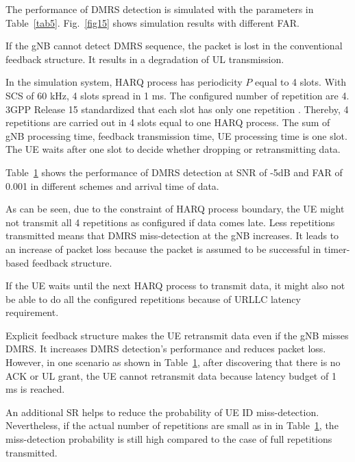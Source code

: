 \documentclass{ieeeaccess}
\begin{document}
\begin{table}[htbp]
\begin{center}
\begin{tabular}{|p{8em}|p{8em}|p{7em}|p{7em}|p{7em}|p{7em}|p{7em}|}
 
 \hline
\end{tabular}
\label{tab8}
\end{center}
\vspace{-6mm}
\end{table}

The performance of DMRS detection is simulated with the parameters in Table~\ref{tab5}. Fig.~\ref{fig15} shows simulation results with different FAR. 

If the gNB cannot detect DMRS sequence, the packet is lost in the conventional feedback structure. It results in a degradation of UL transmission.

In the simulation system, HARQ process has periodicity $P$ equal to 4 slots. With SCS of 60 kHz, 4 slots spread in 1 ms. The configured number of repetition are 4. 3GPP Release 15 standardized that each slot has only one repetition \cite{ref3}. Thereby, 4 repetitions are carried out in 4 slots equal to one HARQ process. The sum of gNB processing time, feedback transmission time, UE processing time is one slot. The UE waits after one slot to decide whether dropping or retransmitting data.

Table~\ref{tab8} shows the performance of DMRS detection at SNR of -5dB and FAR of 0.001 in different schemes and arrival time of data. 

As can be seen, due to the constraint of HARQ process boundary, the UE might not transmit all 4 repetitions as configured if data comes late. Less repetitions transmitted means that DMRS miss-detection at the gNB increases. It leads to an increase of packet loss because the packet is assumed to be successful in timer-based feedback structure.

If the UE waits until the next HARQ process to transmit data, it might also not be able to do all the configured repetitions because of URLLC latency requirement.

Explicit feedback structure makes the UE retransmit data even if the gNB misses DMRS. It increases DMRS detection's performance and reduces packet loss. However, in one scenario as shown in Table~\ref{tab8}, after discovering that there is no ACK or UL grant, the UE cannot retransmit data because latency budget of 1 ms is reached.

An additional SR helps to reduce the probability of UE ID miss-detection. Nevertheless, if the actual number of repetitions are small as in in Table~\ref{tab8}, the miss-detection probability is still high compared to the case of full repetitions transmitted.
\end{document}

